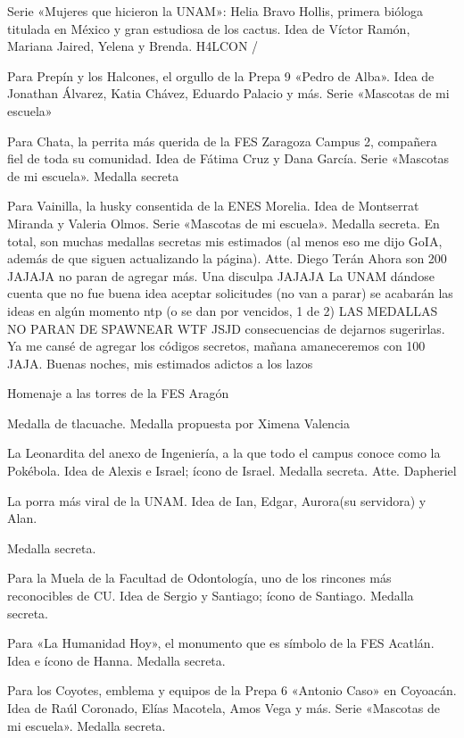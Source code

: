 \begin{description}[leftmargin=1.4cm, style=nextline]
  \item[H3L14] Serie «Mujeres que hicieron la UNAM»: Helia Bravo Hollis, primera bióloga titulada en México y gran estudiosa de los cactus. Idea de Víctor Ramón, Mariana Jaired, Yelena y Brenda. H4LCON /
  \item[PR3P1N] Para Prepín y los Halcones, el orgullo de la Prepa 9 «Pedro de Alba». Idea de Jonathan Álvarez, Katia Chávez, Eduardo Palacio y más. Serie «Mascotas de mi escuela»
  \item[CH4T4] Para Chata, la perrita más querida de la FES Zaragoza Campus 2, compañera fiel de toda su comunidad. Idea de Fátima Cruz y Dana García. Serie «Mascotas de mi escuela». Medalla secreta
  \item[V41N1LL4] Para Vainilla, la husky consentida de la ENES Morelia. Idea de Montserrat Miranda y Valeria Olmos. Serie «Mascotas de mi escuela». Medalla secreta. En total, son muchas medallas secretas mis estimados (al menos eso me dijo GoIA, además de que siguen actualizando la página). Atte. Diego Terán Ahora son 200 JAJAJA no paran de agregar más. Una disculpa JAJAJA La UNAM dándose cuenta que no fue buena idea aceptar solicitudes (no van a parar) se acabarán las ideas en algún momento ntp (o se dan por vencidos, 1 de 2) LAS MEDALLAS NO PARAN DE SPAWNEAR WTF JSJD consecuencias de dejarnos sugerirlas. Ya me cansé de agregar los códigos secretos, mañana amaneceremos con 100 JAJA. Buenas noches, mis estimados adictos a los lazos
  \item[T0RR3S] Homenaje a las torres de la FES Aragón
  \item[TL4CU4] Medalla de tlacuache. Medalla propuesta por Ximena Valencia
  \item[P0K3B0L4] La Leonardita del anexo de Ingeniería, a la que todo el campus conoce como la Pokébola. Idea de Alexis e Israel; ícono de Israel. Medalla secreta. Atte. Dapheriel
  \item[CUPUM4S] La porra más viral de la UNAM. Idea de Ian, Edgar, Aurora(su servidora) y Alan.
  \item[H4YP4R0] Medalla secreta.
  \item[4BR3C0CA] Para la Muela de la Facultad de Odontología, uno de los rincones más reconocibles de CU. Idea de Sergio y Santiago; ícono de Santiago. Medalla secreta.
  \item[HUM4N1D4D] Para «La Humanidad Hoy», el monumento que es símbolo de la FES Acatlán. Idea e ícono de Hanna. Medalla secreta.
  \item[C0Y0T3] Para los Coyotes, emblema y equipos de la Prepa 6 «Antonio Caso» en Coyoacán. Idea de Raúl Coronado, Elías Macotela, Amos Vega y más. Serie «Mascotas de mi escuela». Medalla secreta.

\end{description}
